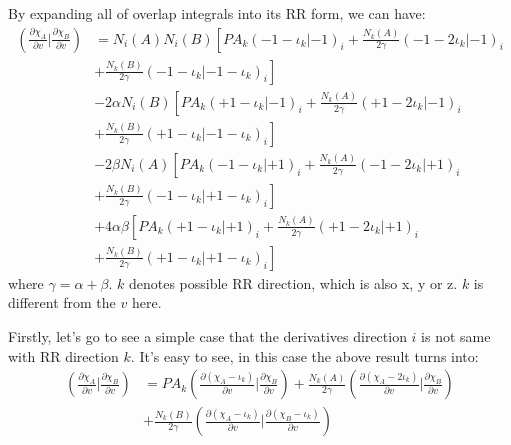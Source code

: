 By expanding all of overlap integrals into its RR form, we can have:
\begin{equation}
 \begin{split}
 \left(  \frac{\partial \chi_{A}}{\partial v}|\frac{\partial \chi_{B}}{\partial v}
\right)  &=  N_{i}(A)N_{i}(B)
\left[ PA_{k}(-1-\iota_{k}|-1)_{i} + \frac{N_{k}(A)}{2 \gamma}(-1-2\iota_{k}|-1)_{i} \right. \\ 
 &+ \left. \frac{N_{k}(B)}{2 \gamma}(-1-\iota_{k}|-1-\iota_{k})_{i} \right] \\
&- 2\alpha N_{i}(B)
\left[ PA_{k}(+1-\iota_{k}|-1)_{i} + \frac{N_{k}(A)}{2 \gamma}(+1-2\iota_{k}|-1)_{i} \right. \\ 
 &+ \left. \frac{N_{k}(B)}{2 \gamma}(+1-\iota_{k}|-1-\iota_{k})_{i} \right] \\ 
&- 2\beta  N_{i}(A)
\left[ PA_{k}(-1-\iota_{k}|+1)_{i} + \frac{N_{k}(A)}{2 \gamma}(-1-2\iota_{k}|+1)_{i} \right. \\ 
 &+ \left. \frac{N_{k}(B)}{2 \gamma}(-1-\iota_{k}|+1-\iota_{k})_{i} \right] \\  
&+ 4\alpha\beta
\left[ PA_{k}(+1-\iota_{k}|+1)_{i} + \frac{N_{k}(A)}{2 \gamma}(+1-2\iota_{k}|+1)_{i} \right. \\ 
 &+ \left. \frac{N_{k}(B)}{2 \gamma}(+1-\iota_{k}|+1-\iota_{k})_{i} \right] 
 \end{split}
 \label{OS_kinetic_eq:3}
\end{equation}
where $\gamma = \alpha + \beta$. $k$ denotes possible RR direction, which is 
also x, y or z. $k$ is different from the $v$ here.

Firstly, let's go to see a simple case that the derivatives direction $i$ is not
same with RR direction $k$. It's easy to see, in this case the above result
turns into:
\begin{equation}
 \begin{split}
 \left(  \frac{\partial \chi_{A}}{\partial v}|\frac{\partial \chi_{B}}{\partial v}
\right)  &= PA_{k}
 \left(\frac{\partial (\chi_{A}-\iota_{k})}{\partial v}|
 \frac{\partial \chi_{B}}{\partial v} \right) + 
\frac{N_{k}(A)}{2 \gamma}
 \left(\frac{\partial (\chi_{A}-2\iota_{k})}{\partial v}|
 \frac{\partial \chi_{B}}{\partial v} \right) \\
&+\frac{N_{k}(B)}{2 \gamma}
 \left(\frac{\partial (\chi_{A}-\iota_{k})}{\partial v}|
 \frac{\partial(\chi_{B}-\iota_{k})}{\partial v} \right) 
 \end{split}
 \label{OS_kinetic_eq:4} 
\end{equation}


